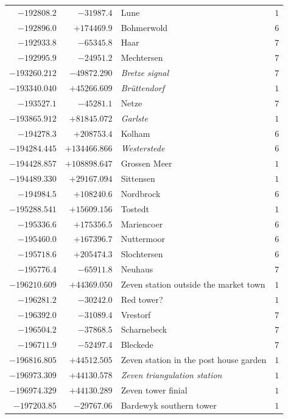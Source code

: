 \begin{center}
\begin{tabular}{r|r|p{170pt}|r}
\(-192808.2\)&\(-31987.4\)&Lune&\(1\)\\
\(-192896.0\)&\(+174469.9\)&Bohmerwold&\(6\)\\
\(-192933.8\)&\(-65345.8\)&Haar&\(7\)\\
\(-192995.9\)&\(-24951.2\)&Mechtersen&\(7\)\\
\(-193260.212\)&\(-49872.290\)&\textit{Bretze signal}&\(7\)\\
\(-193340.040\)&\(+45266.609\)&\textit{Brüttendorf}&\(1\)\\
\(-193527.1\)&\(-45281.1\)&Netze&\(7\)\\
\(-193865.912\)&\(+81845.072\)&\textit{Garlste}&\(1\)\\
\(-194278.3\)&\(+208753.4\)&Kolham&\(6\)\\
\(-194284.445\)&\(+134466.866\)&\textit{Westerstede}&\(6\)\\
\(-194428.857\)&\(+108898.647\)&Grossen Meer&\(1\)\\
\(-194489.330\)&\(+29167.094\)&Sittensen&\(1\)\\
\(-194984.5\)&\(+108240.6\)&Nordbrock&\(6\)\\
\(-195288.541\)&\(+15609.156\)&Tostedt&\(1\)\\
\(-195336.6\)&\(+175356.5\)&Mariencoer&\(6\)\\
\(-195460.0\)&\(+167396.7\)&Nuttermoor&\(6\)\\
\(-195718.6\)&\(+205474.3\)&Slochtersen&\(6\)\\
\(-195776.4\)&\(-65911.8\)&Neuhaus&\(7\)\\
\(-196210.609\)&\(+44369.050\)&Zeven station outside the market town&\(1\)\\
\(-196281.2\)&\(-30242.0\)&Red tower?&\(1\)\\
\(-196392.0\)&\(-31089.4\)&Vrestorf&\(7\)\\
\(-196504.2\)&\(-37868.5\)&Scharnebeck&\(7\)\\
\(-196711.9\)&\(-52497.4\)&Bleckede&\(7\)\\
\(-196816.805\)&\(+44512.505\)&Zeven station in the post house garden&\(1\)\\
\(-196973.309\)&\(+44130.578\)&\textit{Zeven triangulation station}&\(1\)\\
\(-196974.329\)&\(+44130.289\)&Zeven tower finial&\(1\)\\
\(-197203.85\)&\(-29767.06\)&Bardewyk southern tower&\(1\)\\
\hline\end{tabular}\endgroup\end{center}
